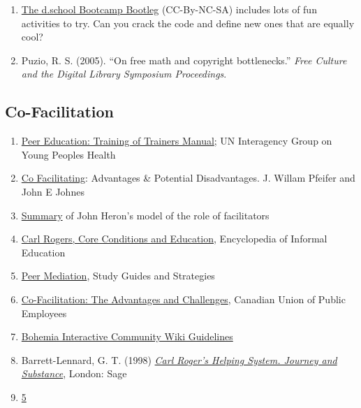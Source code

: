 \begin{enumerate}
\item
  \href{http://dschool.stanford.edu/wp-content/uploads/2011/03/BootcampBootleg2010v2SLIM.pdf}{The
  d.school Bootcamp Bootleg} (CC-By-NC-SA) includes lots of fun
  activities to try. Can you crack the code and define new ones that are
  equally cool?
\item
  Puzio, R. S. (2005). ``On free math and copyright bottlenecks.''
  \emph{Free Culture and the Digital Library Symposium Proceedings}.
\end{enumerate}

\subsection{Co-Facilitation}

\begin{enumerate}
\item
  \href{http://www.scribd.com/doc/54544925/51/TRAINING-TOPIC-Co-facilitation-skills}{Peer
  Education: Training of Trainers Manual}; UN Interagency Group on Young
  Peoples Health
\item
  \href{http://www.breakoutofthebox.com/Co-FacilitatingPfeifferJones.pdf}{Co
  Facilitating}: Advantages \& Potential Disadvantages. J. Willam
  Pfeifer and John E Johnes
\item
  \href{http://reviewing.co.uk/archives/art/13\_1\_what\_do\_facilitators\_do.htm\#8\_WAYS\_OF\_FACILITATING\_ACTIVE\_LEARNING}{Summary}
  of John Heron's model of the role of facilitators
\item
  \href{http://www.infed.org/thinkers/et-rogers.htm}{Carl
  Rogers, Core Conditions and Education}, Encyclopedia of Informal
  Education
\item
  \href{http://www.studygs.net/peermed.htm}{Peer Mediation}, Study
  Guides and Strategies
\item
  \href{http://sk.cupe.ca/updir/cofacilitation-handouts.doc}{Co-Facilitation:
  The Advantages and Challenges}, Canadian Union of Public Employees
\item
  \href{http://community.bistudio.com/wiki/Bohemia\_Interactive\_Community:Guidelines}{Bohemia
  Interactive Community Wiki Guidelines}
\item
  Barrett-Lennard, G. T. (1998)
  \emph{\href{http://openlibrary.org/works/OL2014352W/Carl\_Rogers'\_Helping\_System}{Carl
  Roger's Helping System. Journey and Substance}}, London: Sage
\item
  \href{http://en.wikipedia.org/w/index.php?title=Wikipedia:Five\_pillars\&oldid=501472166}{5
}
\end{enumerate}
